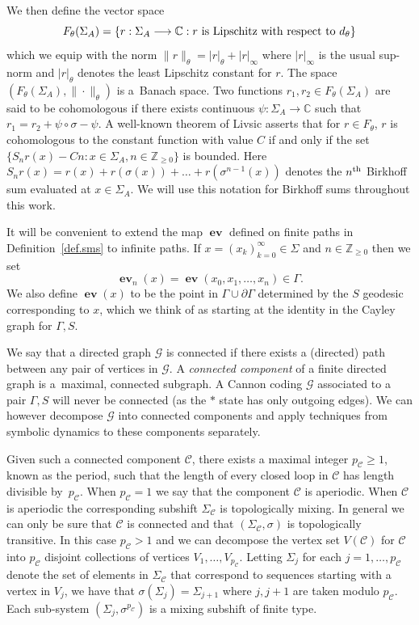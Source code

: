\documentclass[AHL,Unicode,longabstracts,published]{cedram}
\newcommand{\G}{\Gamma}
\renewcommand{\SS}{\Sigma}
\newcommand{\Cc}{\mathcal{C}}
\newcommand{\Gc}{\mathcal{G}}
\newcommand{\C}{\mathbb{C}}
\newcommand{\Z}{\mathbb{Z}}
\DeclareMathOperator{\ev}{\mathbf{ev}}
\let\originalleft\left
\let\originalright\right
\renewcommand{\left}{\mathopen{}\mathclose\bgroup\originalleft}
\renewcommand{\right}{\aftergroup\egroup\originalright}
\renewcommand*{\to}{\mathchoice{\longrightarrow}{\rightarrow}{\rightarrow}{\rightarrow}}
\newcounter{setofcase}
\newcounter{case}[setofcase]
\theoremstyle{plain}
\newcommand{\G}{\Gamma}
\begin{document}
We then define the vector space
\[
F_\theta(\Sigma_A) = \left\{ r : \Sigma_A \to \C:\text{$r$ is Lipschitz with respect to $d_\theta$} \right\}
\]
which we equip with the norm $\|r\|_\theta = |r|_\theta + |r|_\infty$ where $|r|_\infty$ is the usual sup-norm and $|r|_\theta$ denotes the least Lipschitz constant for $r$. The space $(F_\theta(\Sigma_A), \|\cdot\|_\theta)$ is a~Banach space. Two functions $r_1,r_2 \in F_\theta(\SS_A)$ are said to be cohomologous if there exists continuous $\psi :\Sigma_A \rightarrow \C$ such that $r_1=r_2+\psi \circ \sigma - \psi.$ A well-known theorem of Livsic asserts that for $r\in F_\theta$, $r$ is cohomologous to the constant function with value $C$ if and only if the set $\{S_nr(x) - Cn: x\in \Sigma_A, n \in \Z_{\ge 0}\}$ is bounded. Here $S_nr(x) = r(x) + r(\sigma(x))+\dots+r(\sigma^{n-1}(x))$ denotes the $n^{\rm th}$ Birkhoff sum evaluated at $x\in\Sigma_A$. We will use this notation for Birkhoff sums throughout this work.

It will be convenient to extend the map $\ev$ defined on finite paths in Definition~\ref{def.sms} to infinite paths. If $x = (x_k)_{k=0}^\infty \in \SS$ and $n \in \Z_{\ge 0}$ then we set
\[
\ev_n(x) = \ev(x_0, x_1, \dots, x_n) \in \G.
\]
We also define $\ev(x)$ to be the point in $\G \cup \partial \G$ determined by the $S$ geodesic corresponding to $x$, which we think of as starting at the identity in the Cayley graph for $\G,S$.


We say that a directed graph $\Gc$ is connected if there exists a (directed) path between any pair of vertices in $\Gc$. A \emph{connected component} of a finite directed graph is a~maximal, connected subgraph. A Cannon coding $\Gc$ associated to a pair $\G, S$ will never be connected (as the $\ast$ state has only outgoing edges). We can however decompose $\Gc$ into connected components and apply techniques from symbolic dynamics to these components separately.

Given such a connected component $\Cc$, there exists a maximal integer $p_\Cc \ge 1$, known as the period, such that the length of every closed loop in $\Cc$ has length divisible by~$p_\Cc$. When $p_\Cc =1$ we say that the component $\Cc$ is aperiodic. When $\Cc$ is aperiodic the corresponding subshift $\SS_\Cc$ is topologically mixing. In general we can only be sure that $\Cc$ is connected and that $(\SS_\Cc, \sigma)$ is topologically transitive. In this case $p_\Cc >1$ and we can decompose the vertex set $V(\Cc)$ for $\Cc$ into $p_\Cc$ disjoint collections of vertices $V_1, \dots, V_{p_\Cc}$. Letting $\Sigma_j$ for each $j=1,\dots, p_\Cc$ denote the set of elements in $\SS_\Cc$ that correspond to sequences starting with a vertex in $V_j$, we have that $\sigma(\Sigma_j) = \Sigma_{j+1}$ where $j,j+1$ are taken modulo $p_\Cc$. Each sub-system $(\SS_j, \sigma^{p_\Cc})$ is a mixing subshift of finite type.
\end{document}

